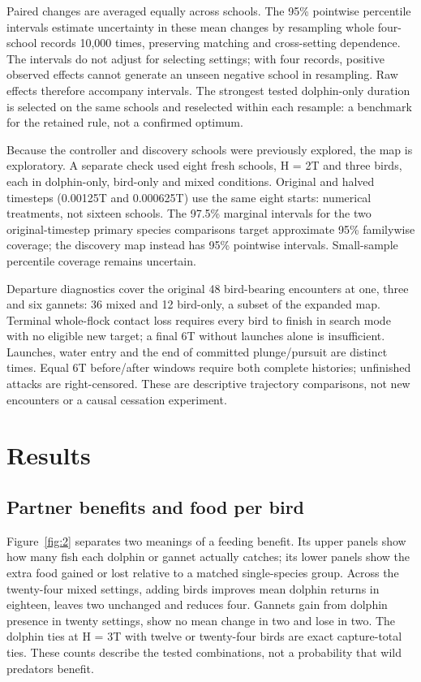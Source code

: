 \documentclass[10pt,a4paper,twocolumn]{article}
\begin{document}
Paired changes are averaged equally across schools. The 95\% pointwise percentile intervals estimate uncertainty in these mean changes by resampling whole four-school records 10,000 times, preserving matching and cross-setting dependence. The intervals do not adjust for selecting settings; with four records, positive observed effects cannot generate an unseen negative school in resampling. Raw effects therefore accompany intervals. The strongest tested dolphin-only duration is selected on the same schools and reselected within each resample: a benchmark for the retained rule, not a confirmed optimum.

Because the controller and discovery schools were previously explored, the map is exploratory. A separate check used eight fresh schools, H = 2T and three birds, each in dolphin-only, bird-only and mixed conditions. Original and halved timesteps (0.00125T and 0.000625T) use the same eight starts: numerical treatments, not sixteen schools. The 97.5\% marginal intervals for the two original-timestep primary species comparisons target approximate 95\% familywise coverage; the discovery map instead has 95\% pointwise intervals. Small-sample percentile coverage remains uncertain.

Departure diagnostics cover the original 48 bird-bearing encounters at one, three and six gannets: 36 mixed and 12 bird-only, a subset of the expanded map. Terminal whole-flock contact loss requires every bird to finish in search mode with no eligible new target; a final 6T without launches alone is insufficient. Launches, water entry and the end of committed plunge/pursuit are distinct times. Equal 6T before/after windows require both complete histories; unfinished attacks are right-censored. These are descriptive trajectory comparisons, not new encounters or a causal cessation experiment.

\section{Results}
\subsection{Partner benefits and food per bird}
Figure~\ref{fig:2} separates two meanings of a feeding benefit. Its upper panels show how many fish each dolphin or gannet actually catches; its lower panels show the extra food gained or lost relative to a matched single-species group. Across the twenty-four mixed settings, adding birds improves mean dolphin returns in eighteen, leaves two unchanged and reduces four. Gannets gain from dolphin presence in twenty settings, show no mean change in two and lose in two. The dolphin ties at H = 3T with twelve or twenty-four birds are exact capture-total ties. These counts describe the tested combinations, not a probability that wild predators benefit.
\end{document}
